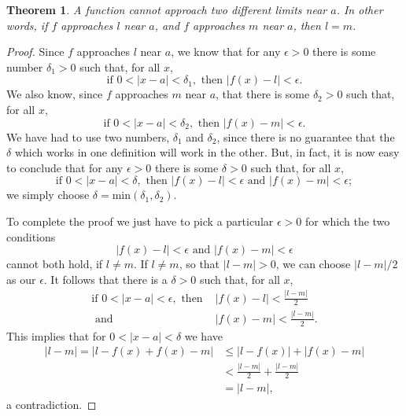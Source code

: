 \documentclass{article}
\newtheorem{theorem}{Theorem}
\begin{document}
\begin{theorem}
  A function cannot approach two different limits near $a$. In other words, if
  $f$ approaches $l$ near $a$, and $f$ approaches $m$ near $a$, then $l = m$.
\end{theorem}
\begin{proof}
  Since $f$ approaches $l$ near $a$, we know that for any $\epsilon > 0$ there
  is some number $\delta_1 > 0$ such that, for all $x$, \begin{equation*}
    \text{if } 0 < |x - a| < \delta_1, \text{ then } |f(x) - l| < \epsilon.
  \end{equation*} 
  We also know, since $f$ approaches $m$ near $a$, that there is some $\delta_2
  > 0$ such that, for all $x$, \begin{equation*}
    \text{if } 0 < |x - a| < \delta_2, \text{ then } |f(x) - m| < \epsilon.
  \end{equation*}
  We have had to use two numbers, $\delta_1$ and $\delta_2$, since there is no
  guarantee that the $\delta$ which works in one definition will work in the
  other. But, in fact, it is now easy to conclude that for any $\epsilon > 0$
  there is some $\delta > 0$ such that, for all $x$, \begin{equation*}
    \text{if } 0 < |x - a| < \delta, \text{ then } |f(x) - l| < \epsilon
      \text{ and } |f(x) - m| < \epsilon;
  \end{equation*} we simply choose $\delta = \mathrm{min}(\delta_1, \delta_2)$.

  To complete the proof we just have to pick a particular $\epsilon > 0$ for
  which the two conditions \begin{equation*}
    |f(x) - l| < \epsilon\text{ and }|f(x) - m| < \epsilon
  \end{equation*} cannot both hold, if $l \neq m$. If $l \neq m$, so that $|l -
  m| > 0$, we can choose $|l - m|/2$ as our $\epsilon$. It follows that there
  is a $\delta > 0$ such that, for all $x$, \begin{align*}
    \text{if } 0 < |x - a| < \epsilon,
      \text{ then } &|f(x) - l| < \frac{|l - m|}{2} \\
      \text{ and } &|f(x) - m| < \frac{|l - m|}{2}.
  \end{align*}
  This implies that for $0 < |x - a| < \delta$ we have \begin{align*}
    |l - m| = |l - f(x) + f(x) - m| &\leq |l - f(x)| + |f(x) - m| \\
      &< \frac{|l - m|}{2} + \frac{|l - m|}{2} \\
      &= |l - m|,
  \end{align*} a contradiction.
\end{proof}
\end{document}
